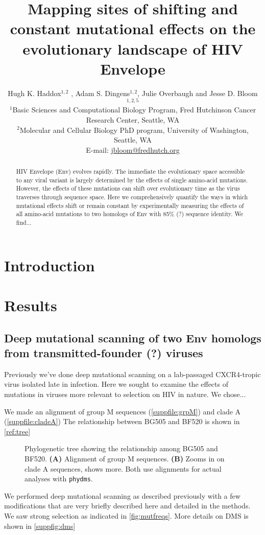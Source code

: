 \documentclass[12pt]{article}
\title{Mapping sites of shifting and constant mutational effects on the evolutionary landscape of HIV Envelope}
\author
{Hugh K. Haddox$^{1,2}$ , Adam S. Dingens$^{1,2}$, Julie Overbaugh and Jesse D. Bloom$^{1,2,5}$\\
\footnotesize{$^1$Basic Sciences and Computational Biology Program, Fred Hutchinson Cancer Research Center, Seattle, WA}\\
\footnotesize{$^2$Molecular and Cellular Biology PhD program, University of Washington, Seattle, WA} \\
\footnotesize{E-mail: \href{jbloom@fredhutch.org}{jbloom@fredhutch.org}}
}
\date{}
\begin{document}
\maketitle


\begin{abstract}
HIV Envelope (Env) evolves rapidly.
The immediate the evolutionary space accessible to any viral variant is largely determined by the effects of single amino-acid mutations.
However, the effects of these mutations can shift over evolutionary time as the virus traverses through sequence space.
Here we comprehensively quantify the ways in which mutational effects shift or remain constant by experimentally measuring the effects of all amino-acid mutations to two homologs of Env with 85\% (?) sequence identity.
We find...
\end{abstract}

\section*{Introduction}

\section*{Results}

\subsection*{Deep mutational scanning of two Env homologs from transmitted-founder (?) viruses}
Previously we've done deep mutational scanning on a lab-passaged CXCR4-tropic virus isolated late in infection.
Here we sought to examine the effects of mutations in viruses more relevant to selection on HIV in nature.
We chose...

We made an alignment of group M sequences (\ref{suppfile:grpM}) and clade A (\ref{suppfile:cladeA})
The relationship between BG505 and BF520 is shown in \ref{ref:tree}

\begin{figure}
\caption{\label{fig:tree}
Phylogenetic tree showing the relationship among BG505 and BF520.
{\bf(A)} Alignment of group M sequences.
{\bf(B)} Zooms in on clade A sequences, shows more.
Both use alignments for actual analyses with \texttt{phydms}.}
\end{figure}

We performed deep mutational scanning as described previously with a few modifications that are very briefly described here and detailed in the methods.
We saw strong selection as indicated in \ref{fig:mutfreqs}.
More details on DMS is shown in \ref{suppfig:dms}
\end{document}
